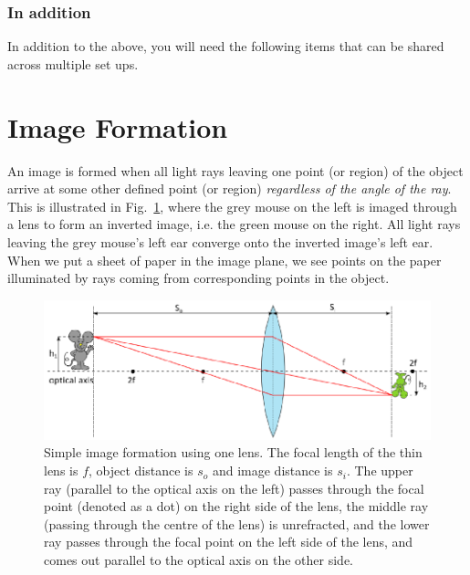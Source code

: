 \documentclass[a4paper]{report}
\begin{document}
\subsubsection{In addition}
In addition to the above, you will need the following items that can be shared across multiple set ups.


\clearpage

\section{Image Formation}
An image is formed when all light rays leaving one point (or region) of the object arrive at some other defined point (or region) \textit{regardless of the angle of the ray}. 
This is illustrated in Fig.~\ref{fig:imageforming}, where the grey mouse on the left is imaged through a lens to form an inverted image, i.e. the green mouse on the right. 
All light rays leaving the grey mouse’s left ear converge onto the inverted image's left ear. 
When we put a sheet of paper in the image plane, we see points on the paper illuminated by rays coming from corresponding points in the object. 



\begin{figure}[h]
\center
\includegraphics{image_forming_basics.eps}
\caption{Simple image formation using one lens. 
The focal length of the thin lens is $f$, object distance is $s_o$ and image distance is $s_i$. 
The upper ray (parallel to the optical axis on the left) passes through the focal point (denoted as a dot) on the right side of the lens, the middle ray (passing through the centre of the lens) is unrefracted, and the lower ray passes through the focal point on the left side of the lens, and comes out parallel to the optical axis on the other side. 
}
\label{fig:imageforming}
\end{figure}
\end{document}
